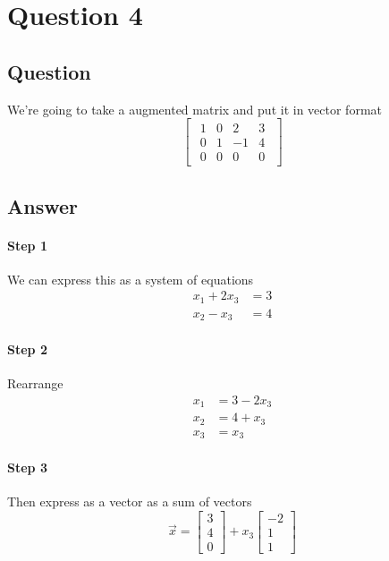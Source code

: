 \documentclass{article}
\begin{document}
    \section{Question 4}
        \subsection{Question}
            We're going to take a augmented matrix and put it in vector format
            \[
            \begin{bmatrix}
            \begin{array}{ccc|c}
                1 &  0 &   2 & 3 \\
                0 &  1 &  -1 & 4 \\
                0 &  0 &   0 & 0
            \end{array}
            \end{bmatrix}
            \]
        \subsection{Answer}
            \paragraph{Step 1}
                We can express this as a system of equations
                \begin{align*}
                    x_1 + 2x_3 &= 3\\
                    x_2 - x_3 &= 4
                \end{align*}
            \paragraph{Step 2}
                Rearrange
                \begin{align*}
                    x_1 &= 3 - 2x_3\\
                    x_2 &= 4 + x_3\\
                    x_3 &= x_3
                \end{align*}
            \paragraph{Step 3}
                Then express as a vector as a sum of vectors
                \[
                \vec{x} 
                = 
                \begin{bmatrix}
                    3\\
                    4\\
                    0
                \end{bmatrix}
                +
                x_3
                \begin{bmatrix}
                    -2\\
                    1\\
                    1
                \end{bmatrix}
                \]
\end{document}
